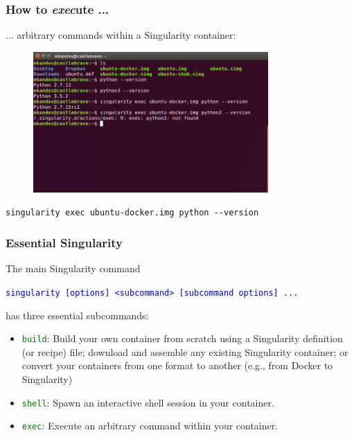 \documentclass{beamer}
\begin{document}
\begin{frame}
   \frametitle{How to \textit{exec}ute ... }
   ... arbitrary commands within a Singularity container:
   \begin{figure}[htbp]
      \includegraphics[width=0.8\textwidth]{images/singularity-exec-python-version-check.png}
   \end{figure}
   \lstinline{singularity exec ubuntu-docker.img python --version}
\end{frame}

\begin{frame}
   \frametitle{Essential Singularity}
   The main Singularity command
   \begin{center}
      \textcolor{blue}{\lstinline{singularity [options] <subcommand> [subcommand options] ...}}
   \end{center}
   has three essential subcommands:
   \begin{itemize}
      \setlength\itemsep{1.0em}
      \item \textcolor{green}{\lstinline{build}}: Build your own container
         from scratch using a Singularity definition (or recipe) file;
         download and assemble any existing Singularity container; or
         convert your containers from one format to another (e.g., from
         Docker to Singularity)
      \item \textcolor{green}{\lstinline{shell}}: Spawn an interactive shell
         session in your container.
      \item \textcolor{green}{\lstinline{exec}}: Execute an arbitrary
         command within your container.
   \end{itemize}
\end{frame}
\end{document}
